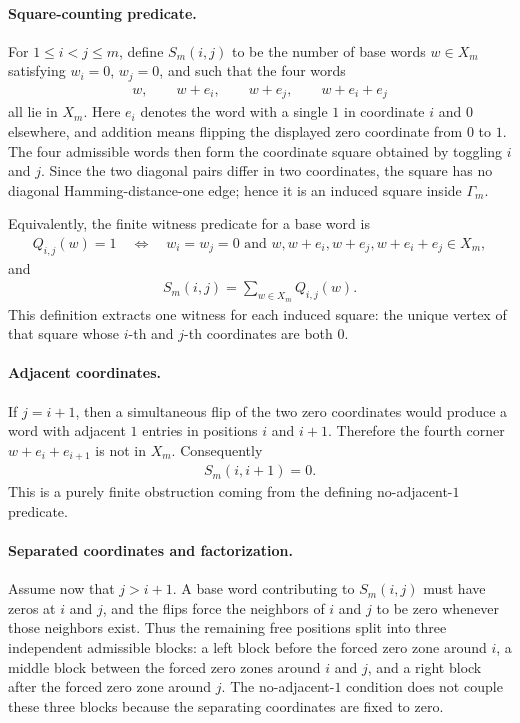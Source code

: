 \paragraph{Square-counting predicate.}
For $1\leq i<j\leq m$, define $S_m(i,j)$ to be the number of base words $w\in X_m$ satisfying $w_i=0$, $w_j=0$, and such that the four words
$$
\begin{aligned}
w,
\qquad w+e_i,
\qquad w+e_j,
\qquad w+e_i+e_j
\end{aligned}
$$
all lie in $X_m$. Here $e_i$ denotes the word with a single $1$ in coordinate $i$ and $0$ elsewhere, and addition means flipping the displayed zero coordinate from $0$ to $1$. The four admissible words then form the coordinate square obtained by toggling $i$ and $j$. Since the two diagonal pairs differ in two coordinates, the square has no diagonal Hamming-distance-one edge; hence it is an induced square inside $\Gamma_m$.

Equivalently, the finite witness predicate for a base word is
$$
\begin{aligned}
Q_{i,j}(w)=1
\quad\Longleftrightarrow\quad
w_i=w_j=0\text{ and }w,w+e_i,w+e_j,w+e_i+e_j\in X_m,
\end{aligned}
$$
and
$$
\begin{aligned}
S_m(i,j)=\sum_{w\in X_m} Q_{i,j}(w).
\end{aligned}
$$
This definition extracts one witness for each induced square: the unique vertex of that square whose $i$-th and $j$-th coordinates are both $0$.

\paragraph{Adjacent coordinates.}
If $j=i+1$, then a simultaneous flip of the two zero coordinates would produce a word with adjacent $1$ entries in positions $i$ and $i+1$. Therefore the fourth corner $w+e_i+e_{i+1}$ is not in $X_m$. Consequently
$$
\begin{aligned}
S_m(i,i+1)=0.
\end{aligned}
$$
This is a purely finite obstruction coming from the defining no-adjacent-$1$ predicate.

\paragraph{Separated coordinates and factorization.}
Assume now that $j>i+1$. A base word contributing to $S_m(i,j)$ must have zeros at $i$ and $j$, and the flips force the neighbors of $i$ and $j$ to be zero whenever those neighbors exist. Thus the remaining free positions split into three independent admissible blocks: a left block before the forced zero zone around $i$, a middle block between the forced zero zones around $i$ and $j$, and a right block after the forced zero zone around $j$. The no-adjacent-$1$ condition does not couple these three blocks because the separating coordinates are fixed to zero.

